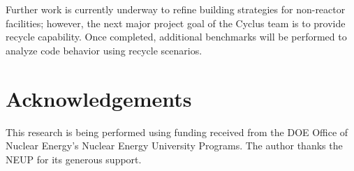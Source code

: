 \documentclass{anstrans}
\begin{document}
Further work is currently underway to refine building strategies for non-reactor facilities; however, the next major project goal of the Cyclus team is to
provide recycle capability. Once completed, additional benchmarks will be performed to analyze code behavior using recycle scenarios.
\section{Acknowledgements}
This research is being performed using funding received from the DOE Office of Nuclear Energy's Nuclear Energy University Programs. 
The author thanks the NEUP for its generous support.

\end{document}
